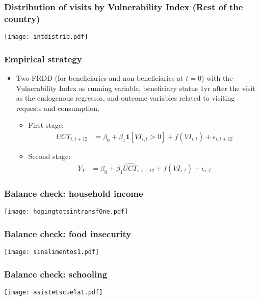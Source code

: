 \documentclass{beamer}
\begin{document}
\begin{frame}
\frametitle{Distribution of visits by Vulnerability Index (Rest of the country)}
\begin{center}
	\texttt{[image: intdistrib.pdf]}
	\label{intdistrib}
\end{center}
\end{frame}

\begin{frame}
\frametitle{Empirical strategy}
\begin{itemize}
	\item Two FRDD (for beneficiaries and non-beneficiaries at $t=0$) with the Vulnerability Index as running variable, beneficiary status 1yr after the visit as the endogenous regressor, and outcome variables related to visiting requests and consumption.
	\begin{itemize}
		\item First stage:	
		\begin{align*}
		UCT_{i,t+12} & = \beta _0 + \beta_1\mathbf{1}[VI_{i,t}>0] + f(VI_{i,t}) + \epsilon_{i,t+12}
		\end{align*}
		\item Second stage:	
		\begin{align*}
		Y_{T} & = \beta _0 + \beta_1\hat{UCT}_{i,t+12} + f(VI_{i,t}) + \epsilon_{i,T}
		\end{align*}
	\end{itemize}
\end{itemize}
\end{frame}

\begin{frame}
\frametitle{Balance check: household income}
\begin{center}
	\texttt{[image: hogingtotsintransfOne.pdf]} 
	\label{hogingtotsintransfOne}
\end{center}
\end{frame}

\begin{frame}
\frametitle{Balance check: food insecurity}
\begin{center}
	\texttt{[image: sinalimentos1.pdf]} 
	\label{sinalimentos1}
\end{center}
\end{frame}

\begin{frame}
\frametitle{Balance check: schooling}
\begin{center}
	\texttt{[image: asisteEscuela1.pdf]} 
	\label{asisteEscuela1}
\end{center}
\end{frame}
\end{document}
